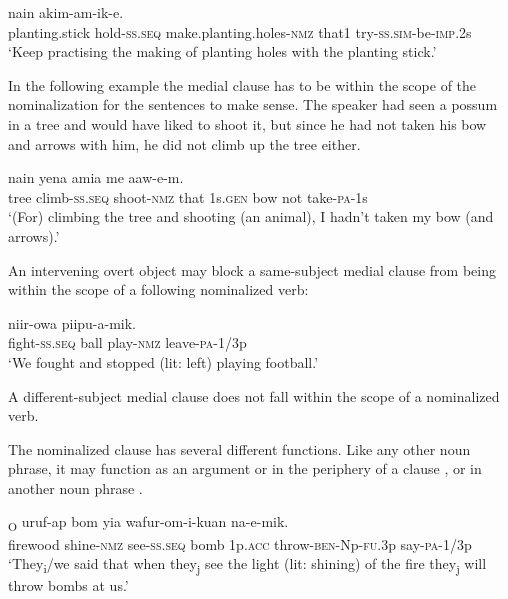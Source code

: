 \ea%
\label{ex:5:x1239}
  nain akim-am-ik-e. \\
     planting.stick  hold-\textsc{ss}.\textsc{seq}  make.planting.holes-\textsc{nmz}  that1 try-\textsc{ss}.\textsc{sim}-be-\textsc{imp}.2s \\
\glt `Keep practising the making of planting holes with the planting stick.'
\z

In the following example  the medial clause has to be within the scope of the nominalization for the sentences to make sense. The speaker had seen a possum in a tree and would have liked to shoot it, but since he had not taken his bow and arrows with him, he did not climb up the tree either.

\ea%
\label{ex:5:x1844}
  nain  yena  amia  me aaw-e-m. \\
     tree  climb-\textsc{ss}.\textsc{seq}  shoot-\textsc{nmz}  that  1s.\textsc{gen}  bow  not take-\textsc{pa}-1s \\
\glt `(For) climbing the tree and shooting (an animal), I hadn't taken my bow (and arrows).'
\z

An intervening overt object may block a same-subject medial clause from being within the scope of a following nominalized verb:

\ea%
\label{ex:5:x1886}
\gll [Irak-ep]    niir-owa  piipu-a-mik. \\
     fight-\textsc{ss}.\textsc{seq}  ball  play-\textsc{nmz}  leave-\textsc{pa}-1/3p \\
\glt `We fought and stopped (lit: left) playing football.'
\z

A different-subject medial clause does not fall within the scope of a nominalized verb. 

The nominalized clause has several different functions. Like any other noun phrase, it may function as an argument  or in the periphery of a clause , or in another noun phrase .

\ea%
\label{ex:5:x1230}
\textsubscript{O}  uruf-ap  bom  yia wafur-om-i-kuan  na-e-mik. \\
     firewood  shine-\textsc{nmz}  see-\textsc{ss}.\textsc{seq}  bomb  1p.\textsc{acc} throw-\textsc{ben}-Np-\textsc{fu}.3p  say-\textsc{pa}-1/3p \\
\glt `They\textsubscript{i}/we said that when they\textsubscript{j} see the light (lit: shining) of the fire they\textsubscript{j} will throw bombs at us.'
\z

